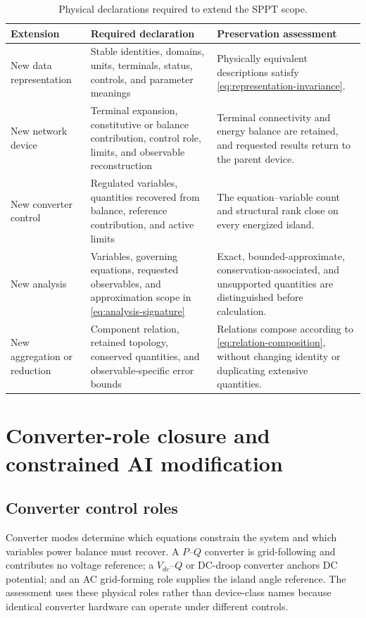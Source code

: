 \documentclass[final,5p,times,twocolumn]{elsarticle}
\begin{document}
\begin{table}[t]
\centering
\caption{Physical declarations required to extend the SPPT scope.}
\label{tab:generality}
\small
\begin{tabularx}{\textwidth}{@{}p{}p{}X@{}}
\toprule
Extension & Required declaration & Preservation assessment \\
\midrule
New data representation & Stable identities, domains, units, terminals, status, controls, and parameter meanings & Physically equivalent descriptions satisfy \eqref{eq:representation-invariance}. \\
New network device & Terminal expansion, constitutive or balance contribution, control role, limits, and observable reconstruction & Terminal connectivity and energy balance are retained, and requested results return to the parent device. \\
New converter control & Regulated variables, quantities recovered from balance, reference contribution, and active limits & The equation--variable count and structural rank close on every energized island. \\
New analysis & Variables, governing equations, requested observables, and approximation scope in \eqref{eq:analysis-signature} & Exact, bounded-approximate, conservation-associated, and unsupported quantities are distinguished before calculation. \\
New aggregation or reduction & Component relation, retained topology, conserved quantities, and observable-specific error bounds & Relations compose according to \eqref{eq:relation-composition}, without changing identity or duplicating extensive quantities. \\
\bottomrule
\end{tabularx}
\end{table}

\section{Converter-role closure and constrained AI modification}\label{sec:ai-modification}

\subsection{Converter control roles}

Converter modes determine which equations constrain the system and which
variables power balance must recover. A $P$--$Q$ converter is grid-following
and contributes no voltage reference; a $V_{dc}$--$Q$ or DC-droop converter
anchors DC potential; and an AC grid-forming role supplies the island angle
reference. The assessment uses these physical roles rather than device-class
names because identical converter hardware can operate under different controls.
\end{document}
